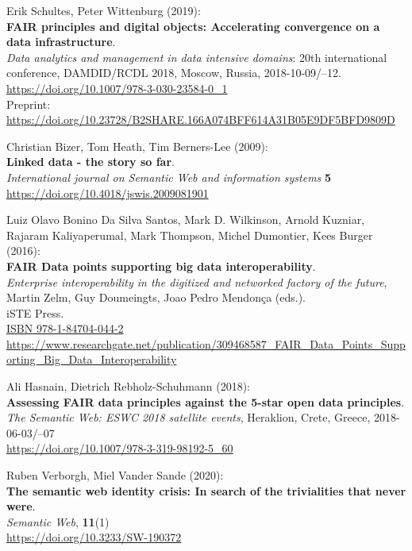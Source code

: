 \begin{thebibliography}{9}
Erik Schultes, Peter Wittenburg (2019): \\
\textbf{FAIR principles and digital objects: Accelerating convergence on a data infrastructure}.\\
\emph{Data analytics and management in data intensive domains}: 20th international conference,
{DAMDID}/{RCDL} 2018, Moscow, Russia, 2018-10-09/--12. \\
\url{https://doi.org/10.1007/978-3-030-23584-0_1}\\
Preprint: \url{https://doi.org/10.23728/B2SHARE.166A074BFF614A31B05E9DF5BFD9809D}

Christian Bizer, Tom Heath, Tim Berners-Lee (2009): \\
\textbf{Linked data - the story so far}. \\
\emph{International journal on Semantic Web and information systems} \textbf{5} \\
\url{https://doi.org/10.4018/jswis.2009081901}

Luiz Olavo Bonino Da Silva Santos, Mark D. Wilkinson, Arnold Kuzniar,
Rajaram Kaliyaperumal, Mark Thompson, Michel Dumontier, Kees Burger
(2016):\\
\textbf{FAIR Data points supporting big data interoperability}. \\
\emph{Enterprise interoperability in the digitized and networked factory of the future}, Martin Zelm, Guy Doumeingts, Joao Pedro Mendonça (eds.).\\
iSTE Press. \\
\href{http://www.iste.co.uk/book.php?id=1073}{ISBN 978-1-84704-044-2} \\
\url{https://www.researchgate.net/publication/309468587_FAIR_Data_Points_Supporting_Big_Data_Interoperability}

Ali Hasnain, Dietrich Rebholz-Schuhmann (2018): \\
\textbf{Assessing FAIR data principles against the 5-star open data principles}. \\
\emph{The Semantic Web: ESWC 2018 satellite events}, Heraklion, Crete, Greece, 2018-06-03/--07 \\
\url{https://doi.org/10.1007/978-3-319-98192-5_60}

Ruben Verborgh, Miel Vander Sande (2020): \\
\textbf{The semantic web identity crisis: In search of the trivialities that never were}.\\
\emph{Semantic Web}, \textbf{11}(1)\\
\url{https://doi.org/10.3233/SW-190372}


\end{thebibliography}
